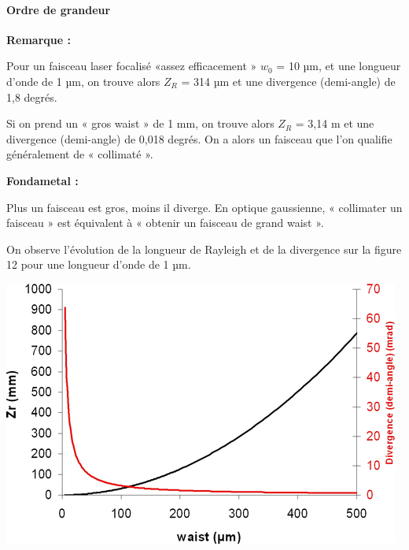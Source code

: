 \documentclass{book}
\begin{document}
\paragraph{Ordre de grandeur}

\textbf{\color{remarque1}Remarque :}  
\begin{mdframed}[linecolor=remarque1, backgroundcolor=remarque2]

Pour un faisceau laser focalisé «assez efficacement » $w_0$ = 10 µm, et une longueur d'onde de 1 µm, on trouve alors $Z_R$ = 314 µm et une divergence (demi-angle) de 1,8 degrés.

Si on prend un « gros waist » de 1 mm, on trouve alors $Z_R$ = 3,14 m et une divergence (demi-angle) de 0,018 degrés. On a alors un faisceau que l'on qualifie généralement de « collimaté ».

\end{mdframed}

\textbf{\color{fondamental1}Fondametal :}  
\begin{mdframed}[linecolor=fondamental1, backgroundcolor=fondamental2]

Plus un faisceau est gros, moins il diverge. En optique gaussienne, « collimater un faisceau » est équivalent à « obtenir un faisceau de grand waist ».

On observe l'évolution de la longueur de Rayleigh et de la divergence sur la figure 12 pour une longueur d'onde de 1 µm.

{\centering
\includegraphics[scale=1.7]{images/fig12.jpg}
\par}

\end{mdframed}
\end{document}
